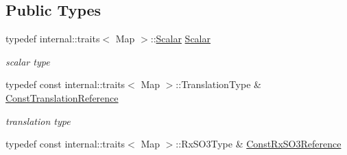 \subsection*{Public Types}
\begin{DoxyCompactItemize}
\item 
typedef internal\+::traits$<$ Map $>$\+::\hyperlink{class_eigen_1_1_map_3_01const_01_sophus_1_1_sim3_group_3_01___scalar_01_4_00_01___options_01_4_af8769c2970043ae3c4a88ced33b421a9}{Scalar} \hyperlink{class_eigen_1_1_map_3_01const_01_sophus_1_1_sim3_group_3_01___scalar_01_4_00_01___options_01_4_af8769c2970043ae3c4a88ced33b421a9}{Scalar}\hypertarget{class_eigen_1_1_map_3_01const_01_sophus_1_1_sim3_group_3_01___scalar_01_4_00_01___options_01_4_af8769c2970043ae3c4a88ced33b421a9}{}\label{class_eigen_1_1_map_3_01const_01_sophus_1_1_sim3_group_3_01___scalar_01_4_00_01___options_01_4_af8769c2970043ae3c4a88ced33b421a9}

\begin{DoxyCompactList}\small\item\em scalar type \end{DoxyCompactList}\item 
typedef const internal\+::traits$<$ Map $>$\+::Translation\+Type \& \hyperlink{class_eigen_1_1_map_3_01const_01_sophus_1_1_sim3_group_3_01___scalar_01_4_00_01___options_01_4_a1b5c44cd51659f195655a0a20e506289}{Const\+Translation\+Reference}\hypertarget{class_eigen_1_1_map_3_01const_01_sophus_1_1_sim3_group_3_01___scalar_01_4_00_01___options_01_4_a1b5c44cd51659f195655a0a20e506289}{}\label{class_eigen_1_1_map_3_01const_01_sophus_1_1_sim3_group_3_01___scalar_01_4_00_01___options_01_4_a1b5c44cd51659f195655a0a20e506289}

\begin{DoxyCompactList}\small\item\em translation type \end{DoxyCompactList}\item 
typedef const internal\+::traits$<$ Map $>$\+::Rx\+S\+O3\+Type \& \hyperlink{class_eigen_1_1_map_3_01const_01_sophus_1_1_sim3_group_3_01___scalar_01_4_00_01___options_01_4_a486ddf84534c6214b62fa62540883248}{Const\+Rx\+S\+O3\+Reference}\hypertarget{class_eigen_1_1_map_3_01const_01_sophus_1_1_sim3_group_3_01___scalar_01_4_00_01___options_01_4_a486ddf84534c6214b62fa62540883248}{}\label{class_eigen_1_1_map_3_01const_01_sophus_1_1_sim3_group_3_01___scalar_01_4_00_01___options_01_4_a486ddf84534c6214b62fa62540883248}


\end{DoxyCompactItemize}
